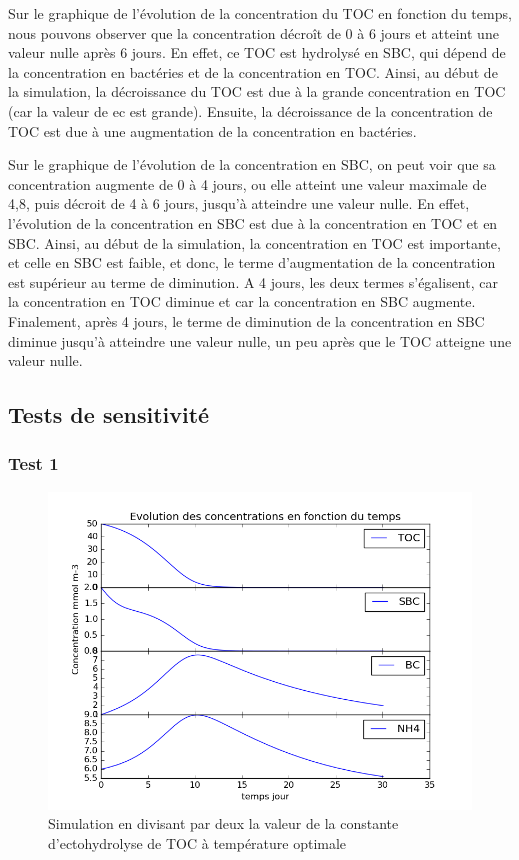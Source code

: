 \par{
Sur le graphique de l'\'evolution de la concentration du TOC en fonction du temps, nous pouvons observer que la concentration d\'ecro\^it de 0 \`a 6 jours et atteint une valeur nulle apr\`es 6 jours. En effet, ce TOC est hydrolys\'e en SBC, qui d\'epend de la concentration en bact\'eries et de la concentration en TOC. Ainsi, au d\'ebut de la simulation, la d\'ecroissance du TOC est due \`a la grande concentration en TOC (car la valeur de ec est grande). Ensuite, la d\'ecroissance de la concentration de TOC est due \`a une augmentation de la concentration en bact\'eries.
}
\par{
Sur le graphique de l'\'evolution de la concentration en SBC, on peut voir que sa concentration augmente de 0 \`a 4 jours, ou elle atteint une valeur maximale de 4,8, puis d\'ecroit de 4 \`a 6 jours, jusqu'\`a atteindre une valeur nulle. En effet, l'\'evolution de la concentration en SBC est due \`a la concentration en TOC et en SBC. Ainsi, au d\'ebut de la simulation, la concentration en TOC est importante, et celle en SBC est faible, et donc, le terme d'augmentation de la concentration est sup\'erieur au terme de diminution. A 4 jours, les deux termes s'\'egalisent, car la concentration en TOC diminue et car la concentration en SBC augmente. Finalement, apr\`es 4 jours, le terme de diminution de la concentration en SBC diminue jusqu'\`a atteindre une valeur nulle, un peu apr\`es que le TOC atteigne une valeur nulle.
}

\subsection{Tests de sensitivit\'e}
\subsubsection{Test 1}

\begin{figure}[h!]
  \includegraphics[width=\textwidth]{partie1/Test1.png}
  \caption{Simulation en divisant par deux la valeur de la constante d'ectohydrolyse de TOC \`a temp\'erature optimale
  }
  \label{fig:partie1test1}
\end{figure}



